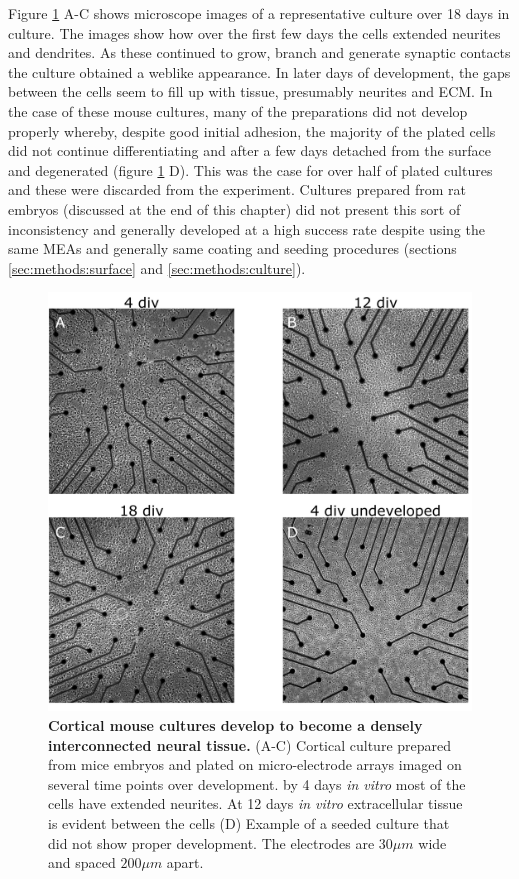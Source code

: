     Figure \ref{fig:activity:mouseImages} A-C shows microscope images of a representative culture over 18 days in culture. The images show how over the first few days the cells extended neurites and dendrites. As these continued to grow, branch and generate synaptic contacts the culture obtained a weblike appearance. In later days of development, the gaps between the cells seem to fill up with tissue, presumably neurites and ECM. In the case of these mouse cultures, many of the preparations did not develop properly whereby, despite good initial adhesion, the majority of the plated cells did not continue differentiating and after a few days detached from the surface and degenerated (figure \ref{fig:activity:mouseImages} D). This was the case for over half of plated cultures and these were discarded from the experiment. Cultures prepared from rat embryos (discussed at the end of this chapter) did not present this sort of inconsistency and generally developed at a high success rate despite using the same MEAs and generally same coating and seeding procedures (sections \ref{sec:methods:surface} and \ref{sec:methods:culture}).
       \begin{figure}[!htb]
            \centering
            \includegraphics[width=15cm]{chapter3/figures/mouseImages/mouseImages.jpg}

            \caption[Representative images of a cortical mouse culture developing on a planar multi electrode array]{\textbf{Cortical mouse cultures develop to become a densely interconnected neural tissue.} (A-C) Cortical culture prepared from mice embryos and plated on micro-electrode arrays imaged on several time points over development. by 4 days \textit{in vitro} most of the cells have extended neurites. At 12 days \textit{in vitro}
            extracellular tissue is evident between the cells (D) Example of a seeded culture that did not show proper development. The electrodes are \(30 \mu m\) wide and spaced \(200 \mu m\) apart.}
            \label{fig:activity:mouseImages}
        \end{figure}




